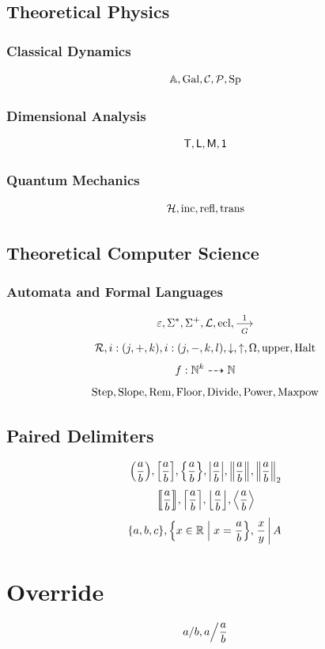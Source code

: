 \documentclass{article}
\begin{document}
\subsection{Theoretical Physics}

\subsubsection{Classical Dynamics}
\[
    \mathbb{A}, \operatorname{Gal}, \mathcal{C}, \mathcal{P}, \operatorname{Sp}
\]

\subsubsection{Dimensional Analysis}
\[
    \mathsf{T}, \mathsf{L}, \mathsf{M}, \mathsf{1}
\]

\subsubsection{Quantum Mechanics}
\[
    \mathcal{H}, \text{inc}, \text{refl}, \text{trans}
\]

\subsection{Theoretical Computer Science}

\subsubsection{Automata and Formal Languages}
\[
    \emptyword, \Sigma\kstar, \Sigma\kplus, \langacc, \ecl, \prodrule[1][G]
\]
\[
    \registerMachine, \sPlus{i}{j}{k}, \sMinus{i}{j}{k}{l}, \halt, \nothalt, \haltingSet, \upper, \Halt
\]
\[
    f: \mathbb{N}^k \dashrightarrow \mathbb{N}
\]
\[
    \operatorname{Step}, \operatorname{Slope}, \operatorname{Rem}, \operatorname{Floor}, \operatorname{Divide}, \operatorname{Power}, \operatorname{Maxpow}
\]

\subsection{Paired Delimiters}
\[
    \pqty{\frac{a}{b}}, \bqty{\frac{a}{b}}, \Bqty{\frac{a}{b}}, \abs{\frac{a}{b}}, \norm{\frac{a}{b}}, \norm[2]{\frac{a}{b}}
\]
\[
    \bbrac{\frac{a}{b}}, \ceil{\frac{a}{b}}, \floor{\frac{a}{b}}, \angBrac{\frac{a}{b}}
\]
\[
    \set{a, b, c}, \set{x \in \RR}{x = \frac{a}{b}}, \bound{\Conditional{\frac{x}{y}}{A}}
\]

\section{Override}
\[
    \flatfrac{a}{b}, \flatfrac{a}{\frac{a}{b}}
\]
\end{document}
